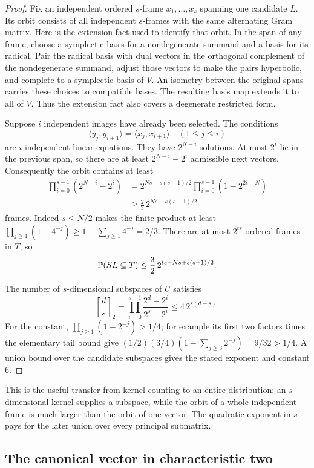 \begin{proof}
Fix an independent ordered $s$-frame $x_1,\ldots,x_s$ spanning one candidate $L$. Its orbit consists of all independent $s$-frames with the same alternating Gram matrix. Here is the extension fact used to identify that orbit. In the span of any frame, choose a symplectic basis for a nondegenerate summand and a basis for its radical. Pair the radical basis with dual vectors in the orthogonal complement of the nondegenerate summand, adjust those vectors to make the pairs hyperbolic, and complete to a symplectic basis of $V$. An isometry between the original spans carries these choices to compatible bases. The resulting basis map extends it to all of $V$. Thus the extension fact also covers a degenerate restricted form.

Suppose $i$ independent images have already been selected. The conditions
\[
 \langle y_j,y_{i+1}\rangle=\langle x_j,x_{i+1}\rangle
 \quad(1\le j\le i)
\]
are $i$ independent linear equations. They have $2^{N-i}$ solutions. At most $2^i$ lie in the previous span, so there are at least $2^{N-i}-2^i$ admissible next vectors. Consequently the orbit contains at least
\begin{align*}
 \prod_{i=0}^{s-1}(2^{N-i}-2^i)
 &=2^{Ns-s(s-1)/2}\prod_{i=0}^{s-1}(1-2^{2i-N})\\
 &\ge\frac23\,2^{Ns-s(s-1)/2}
\end{align*}
frames. Indeed $s\le N/2$ makes the finite product at least
$\prod_{j\ge1}(1-4^{-j})\ge1-\sum_{j\ge1}4^{-j}=2/3$.
There are at most $2^{ts}$ ordered frames in $T$, so
\[
 \mathbb P(SL\subseteq T)
 \le\frac32\,2^{ts-Ns+s(s-1)/2}.
\]

The number of $s$-dimensional subspaces of $U$ satisfies
\[
 {d\brack s}_2
 =\prod_{i=0}^{s-1}\frac{2^d-2^i}{2^s-2^i}
 \le4\,2^{s(d-s)}.
\]
For the constant, $\prod_{j\ge1}(1-2^{-j})>1/4$; for example its first two factors times the elementary tail bound give
$(1/2)(3/4)(1-\sum_{j\ge3}2^{-j})=9/32>1/4$.
A union bound over the candidate subspaces gives the stated exponent and constant $6$.
\end{proof}

This is the useful transfer from kernel counting to an entire distribution: an $s$-dimensional kernel supplies a subspace, while the orbit of a whole independent frame is much larger than the orbit of one vector. The quadratic exponent in $s$ pays for the later union over every principal submatrix.

\subsection{The canonical vector in characteristic two}

